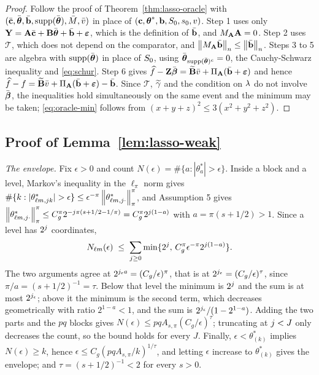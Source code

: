 \begin{proof}
Follow the proof of Theorem~\ref{thm:lasso-oracle} with
$(\bar{\mathbf{c}},\bar{\boldsymbol{\theta}},\bar{\mathbf{b}},\operatorname{supp}(\bar{\boldsymbol{\theta}}),\bar M,\bar v)$ in place of
$(\mathbf{c},\boldsymbol{\theta}^{*},\mathbf{b},S_{0},s_0,v)$. Step 1 uses only
$\mathbf{Y} = \mathbf{A}\bar{\mathbf{c}}+\mathbf{B}\bar{\boldsymbol{\theta}}+\bar{\mathbf{b}}+\boldsymbol{\varepsilon}$, which is the definition of
$\bar{\mathbf{b}}$, and $M_{\mathbf{A}}\mathbf{A} = 0$. Step 2 uses $\mathcal{T}$, which does not depend
on the comparator, and $\left\lVert M_{\mathbf{A}}\bar{\mathbf{b}} \right\rVert_{n} \le \left\lVert \bar{\mathbf{b}} \right\rVert_{n}$. Steps 3 to 5 are
algebra with $\operatorname{supp}(\bar{\boldsymbol{\theta}})$ in place of $S_{0}$, using
$\bar{\boldsymbol{\theta}}_{\operatorname{supp}(\bar{\boldsymbol{\theta}})^c} = 0$, the Cauchy-Schwarz inequality and
\eqref{eq:schur}. Step 6 gives
$\widehat{f}-\mathbf{Z}\bar{\boldsymbol{\beta}} = \widetilde{\mathbf{B}}\bar v + \Pi_{\mathbf{A}}(\bar{\mathbf{b}}+\boldsymbol{\varepsilon})$ and hence
$\widehat{f}-f = \widetilde{\mathbf{B}}\bar v+\Pi_{\mathbf{A}}(\bar{\mathbf{b}}+\boldsymbol{\varepsilon})-\bar{\mathbf{b}}$. Since $\mathcal{T}$,
$\widetilde{\gamma}$ and the condition on $\lambda$ do not involve $\bar{\boldsymbol{\beta}}$, the
inequalities hold simultaneously on the same event and the minimum may be
taken; \eqref{eq:oracle-min} follows from
$(x+y+z)^2 \le 3(x^2+y^2+z^2)$.
\end{proof}

\subsection*{Proof of Lemma~\ref{lem:lasso-weak}}

\emph{The envelope.} Fix $\epsilon>0$ and count
$N(\epsilon) = \#\{a : |\theta^{*}_a| > \epsilon\}$. Inside a block and a
level, Markov's inequality in the $\ell_\pi$ norm gives
$\#\{\tsl : |\coefs{\cv}{\md}{\lev}{\tsl}|>\epsilon\} \le
\epsilon^{-\pi}\norm{\theta^{*}_{\cv\md,\lev\cdot}}^{\pi}_{\pi}$, and
Assumption 5 gives
$\left\lVert \theta^{*}_{\ell m,j\cdot} \right\rVert^{\pi}_{\pi} \le
C_g^{\pi}2^{-j\pi(s+1/2-1/\pi)} = C_g^{\pi}2^{j(1-a)}$ with
$a = \pi(s+1/2)>1$. Since a level has $2^{j}$ coordinates,
\[
  N_{\ell m}(\epsilon) \;\le\; \sum_{j\ge0}
  \min\{2^{j},\, C_g^{\pi}\epsilon^{-\pi}2^{j(1-a)}\} .
\]
The two arguments agree at $2^{j_\epsilon a} = (C_g/\epsilon)^{\pi}$, that
is at $2^{j_\epsilon} = (C_g/\epsilon)^{\tau}$, since
$\pi/a = (s+1/2)^{-1} = \tau$. Below that level the minimum is $2^{j}$ and
the sum is at most $2^{j_\epsilon}$; above it the minimum is the second
term, which decreases geometrically with ratio $2^{1-a}<1$, and the sum is
$2^{j_\epsilon}/(1-2^{1-a})$. Adding the two parts and the $pq$ blocks
gives $N(\epsilon) \le pqA_{s,\pi}(C_g/\epsilon)^{\tau}$; truncating at
$j<J$ only decreases the count, so the bound holds for every $J$. Finally,
$\epsilon < \theta^{*}_{(k)}$ implies $N(\epsilon) \ge k$, hence
$\epsilon \le C_g(pqA_{s,\pi}/k)^{1/\tau}$, and letting $\epsilon$ increase to
$\theta^{*}_{(k)}$ gives the envelope; and $\tau = (s+1/2)^{-1} < 2$ for every
$s>0$.

